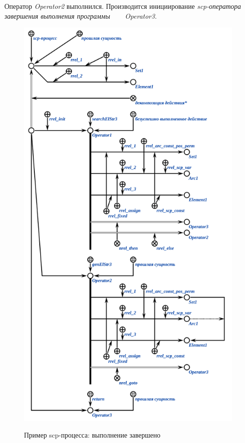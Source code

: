 Оператор \textit{Operator2} выполнился. Производится инициирование \textit{scp-оператора завершения выполнения программы} ~~~ \textit{Operator3}.

\begin{figure}[H]
	\centering
	\caption{Пример scp-процесса: выполнение завершено}
	\includegraphics[scale=0.8]{images/part3/chapter_situation_management/process_example4.png}
	\label{fig:process_example4}
\end{figure}

